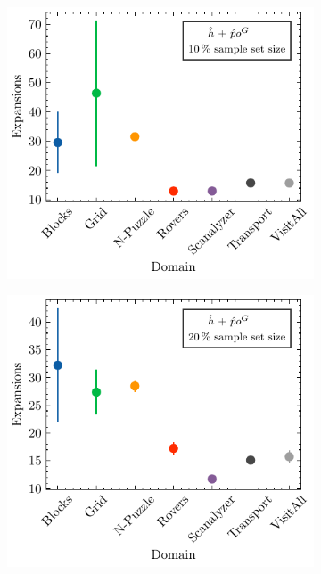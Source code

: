 \documentclass[ppgc,diss,english]{iiufrgs}
\begin{document}
\begin{figure}
  \begin{subfigure}{0.41\textwidth}
    \centering
    \includegraphics[width=\linewidth]{img/error_hNN_poG_10pct.pdf}
  \end{subfigure}
  \begin{subfigure}{0.41\textwidth}
    \centering
    \includegraphics[width=\linewidth]{img/error_hNN_poG_20pct.pdf}
  \end{subfigure}


\end{figure}
\end{document}

